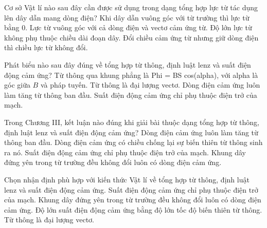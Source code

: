\begin{ex}
Cơ sở Vật lí nào sau đây cần được sử dụng trong dạng tổng hợp lực từ tác dụng lên dây dẫn mang dòng điện?
\choice
{Khi dây dẫn vuông góc với từ trường thì lực từ bằng 0.}
{\True Lực từ vuông góc với cả dòng điện và vectơ cảm ứng từ.}
{Độ lớn lực từ không phụ thuộc chiều dài đoạn dây.}
{Đổi chiều cảm ứng từ nhưng giữ dòng điện thì chiều lực từ không đổi.}
\end{ex}

\begin{ex}
Phát biểu nào sau đây đúng về tổng hợp từ thông, định luật lenz và suất điện động cảm ứng?
\choice
{\True Từ thông qua khung phẳng là Phi = BS cos(alpha), với alpha là góc giữa $B$ và pháp tuyến.}
{Từ thông là đại lượng vectơ.}
{Dòng điện cảm ứng luôn làm tăng từ thông ban đầu.}
{Suất điện động cảm ứng chỉ phụ thuộc điện trở của mạch.}
\end{ex}

\begin{ex}
Trong Chương III, kết luận nào đúng khi giải bài thuộc dạng tổng hợp từ thông, định luật lenz và suất điện động cảm ứng?
\choice
{Dòng điện cảm ứng luôn làm tăng từ thông ban đầu.}
{\True Dòng điện cảm ứng có chiều chống lại sự biến thiên từ thông sinh ra nó.}
{Suất điện động cảm ứng chỉ phụ thuộc điện trở của mạch.}
{Khung dây đứng yên trong từ trường đều không đổi luôn có dòng điện cảm ứng.}
\end{ex}

\begin{ex}
Chọn nhận định phù hợp với kiến thức Vật lí về tổng hợp từ thông, định luật lenz và suất điện động cảm ứng.
\choice
{Suất điện động cảm ứng chỉ phụ thuộc điện trở của mạch.}
{Khung dây đứng yên trong từ trường đều không đổi luôn có dòng điện cảm ứng.}
{\True Độ lớn suất điện động cảm ứng bằng độ lớn tốc độ biến thiên từ thông.}
{Từ thông là đại lượng vectơ.}
\end{ex}

